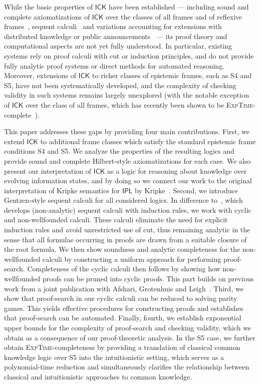 \documentclass{myifcolog}
\newcommand{\ICK}{\mathsf{ICK}}
\numberwithin{theorem}{section}
\begin{document}
While the basic properties of $\mathsf{ICK}$ have been established — including sound and complete axiomatizations of $\ICK$ over the classes of all frames and of reflexive frames~\cite{marti_2017}, sequent calculi~\cite{jager-intuitionistic_2016} and variations accounting for extensions with distributed knowledge or public announcements~\cite{jager-distributed_2016, murai_2022, murai_2024} — its proof theory and computational aspects are not yet fully understood. In particular, existing systems rely on proof calculi with cut or induction principles, and do not provide fully analytic proof systems or direct methods for automated reasoning. Moreover, extensions of $\mathsf{ICK}$ to richer classes of epistemic frames, such as S4 and S5, have not been systematically developed, and the complexity of checking validity in such systems remains largely unexplored (with the notable exception of $\ICK$ over the class of all frames, which has recently been shown to be \textsc{ExpTime}-complete~\cite{Fernandez-Duque_complexity_2025}).


This paper addresses these gaps by providing four main contributions. First, we extend $\ICK$ to additional frame classes which satisfy the standard epistemic frame conditions S4 and S5. We analyze the properties of the resulting logics and provide sound and complete Hilbert-style axiomatizations for each case. We also present our interpretation of $\ICK$ as a logic for reasoning about knowledge over evolving information states, and by doing so we connect our work to the original interpretation of Kripke semantics for $\mathsf{IPL}$ by Kripke~\cite{Kripke_1965}. Second, we introduce Gentzen-style sequent calculi for all considered logics. In difference to~\cite{jager-intuitionistic_2016}, which develops (non-analytic) sequent calculi with induction rules, we work with cyclic and non-wellfounded calculi. These calculi eliminate the need for explicit induction rules and avoid unrestricted use of cut, thus remaining analytic in the sense that all formulae occurring in proofs are drawn from a suitable closure of the root formula. We then show soundness and analytic completeness for the non-wellfounded calculi by constructing a uniform approach for performing proof-search. Completeness of the cyclic calculi then follows by showing how non-wellfounded proofs can be pruned into cyclic proofs. This part builds on previous work from a joint publication with Afshari, Grotenhuis and Leigh~\cite{afshari_intuitionistic_2024}.  Third, we show that proof-search in our cyclic calculi can be reduced to solving parity games. This yields effective procedures for constructing proofs and establishes that proof-search can be automated. Finally, fourth, we establish exponential upper bounds for the complexity of proof-search and checking validity, which we obtain as a consequence of our proof-theoretic analysis. In the S5 case, we further obtain \textsc{ExpTime}-completeness by providing a translation of classical common knowledge logic over S5 into the intuitionistic setting, which serves as a polynomial-time reduction and simultaneously clarifies the relationship between classical and intuitionistic approaches to common knowledge. \smallskip
\end{document}
